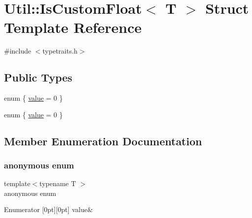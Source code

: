 \hypertarget{structUtil_1_1IsCustomFloat}{}\section{Util\+:\+:Is\+Custom\+Float$<$ T $>$ Struct Template Reference}
\label{structUtil_1_1IsCustomFloat}


{\ttfamily \#include $<$typetraits.\+h$>$}

\subsection*{Public Types}
\begin{DoxyCompactItemize}
\item 
enum \{ \mbox{\hyperlink{structUtil_1_1IsCustomFloat_a2ad9e3368eb4a8922eb9e35c88a119e2a9731c1a78425d1ca970cc086ff7699e1}{value}} = 0
 \}
\item 
enum \{ \mbox{\hyperlink{structUtil_1_1IsCustomFloat_a2ad9e3368eb4a8922eb9e35c88a119e2a9731c1a78425d1ca970cc086ff7699e1}{value}} = 0
 \}
\end{DoxyCompactItemize}


\subsection{Member Enumeration Documentation}
\mbox{\label{structUtil_1_1IsCustomFloat_a44e5b740b1581488b8da0c7a84771533}} 
\subsubsection{\texorpdfstring{anonymous enum}{anonymous enum}}
{\footnotesize\ttfamily template$<$typename T $>$ \\
anonymous enum}

\begin{DoxyEnumFields}{Enumerator}
[0pt][0pt]{}\mbox{\label{structUtil_1_1IsCustomFloat_a2ad9e3368eb4a8922eb9e35c88a119e2a9731c1a78425d1ca970cc086ff7699e1}} 
value&\\
\hline

\end{DoxyEnumFields}
\mbox{\label{structUtil_1_1IsCustomFloat_a2ad9e3368eb4a8922eb9e35c88a119e2}} 
